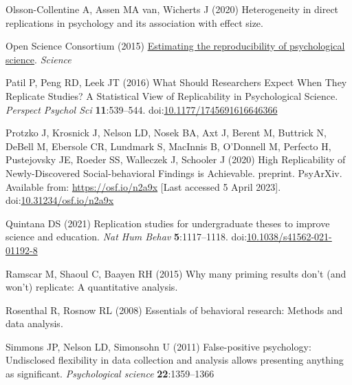 \documentclass[
  english,
  a4paper,
]{article}
\newlength{\cslhangindent}
\newlength{\cslentryspacingunit} %
\newenvironment{CSLReferences}[2] %
 {%
  \setlength{\parindent}{0pt}
  \ifodd #1
  \let\oldpar\par
  \def\par{\hangindent=\cslhangindent\oldpar}
  \fi
  \setlength{\parskip}{#2\cslentryspacingunit}
 }%
 {}
\begin{document}
\begin{CSLReferences}{1}{0}
\leavevmode{}%
Olsson-Collentine A, Assen MA van, Wicherts J (2020) Heterogeneity in direct replications in psychology and its association with effect size.

\leavevmode{}%
Open Science Consortium (2015) \href{https://www.science.org/doi/full/10.1126/science.aac4716?casa_token=IJ35TwwlcjsAAAAA\%3AqiP68QbVAHleIg9zD3WugKWuV6Oa5rswS0VQnDsCq5I14ME4WIQabNGVD_T6SBSuAt6voVHNnWc0sw}{Estimating the reproducibility of psychological science}. \emph{Science}

\leavevmode{}%
Patil P, Peng RD, Leek JT (2016) What {Should Researchers Expect When They Replicate Studies}? {A Statistical View} of {Replicability} in {Psychological Science}. \emph{Perspect Psychol Sci} \textbf{11}:539--544. doi:\href{https://doi.org/10.1177/1745691616646366}{10.1177/1745691616646366}

\leavevmode{}%
Protzko J, Krosnick J, Nelson LD, Nosek BA, Axt J, Berent M, Buttrick N, DeBell M, Ebersole CR, Lundmark S, MacInnis B, O'Donnell M, Perfecto H, Pustejovsky JE, Roeder SS, Walleczek J, Schooler J (2020) High {Replicability} of {Newly-Discovered Social-behavioral Findings} is {Achievable}. preprint. {PsyArXiv}. Available from: \url{https://osf.io/n2a9x} {[}Last accessed 5 April 2023{]}. doi:\href{https://doi.org/10.31234/osf.io/n2a9x}{10.31234/osf.io/n2a9x}

\leavevmode{}%
Quintana DS (2021) Replication studies for undergraduate theses to improve science and education. \emph{Nat Hum Behav} \textbf{5}:1117--1118. doi:\href{https://doi.org/10.1038/s41562-021-01192-8}{10.1038/s41562-021-01192-8}

\leavevmode{}%
Ramscar M, Shaoul C, Baayen RH (2015) Why many priming results don't (and won't) replicate: {A} quantitative analysis.

\leavevmode{}%
Rosenthal R, Rosnow RL (2008) Essentials of behavioral research: Methods and data analysis.

\leavevmode{}%
Simmons JP, Nelson LD, Simonsohn U (2011) False-positive psychology: Undisclosed flexibility in data collection and analysis allows presenting anything as significant. \emph{Psychological science} \textbf{22}:1359--1366


\end{CSLReferences}
\end{document}

